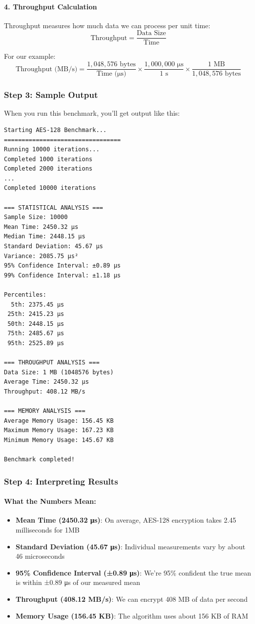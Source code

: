 \documentclass[12pt,a4paper]{article}
\begin{document}
\paragraph{4. Throughput Calculation}
Throughput measures how much data we can process per unit time:
\[ \text{Throughput} = \frac{\text{Data Size}}{\text{Time}} \]

For our example:
\[ \text{Throughput (MB/s)} = \frac{1,048,576 \text{ bytes}}{\text{Time (μs)}} \times \frac{1,000,000 \text{ μs}}{1 \text{ s}} \times \frac{1 \text{ MB}}{1,048,576 \text{ bytes}} \]

\subsubsection{Step 3: Sample Output}

When you run this benchmark, you'll get output like this:

\begin{lstlisting}[language=text, caption=Sample Benchmark Output]
Starting AES-128 Benchmark...
=================================
Running 10000 iterations...
Completed 1000 iterations
Completed 2000 iterations
...
Completed 10000 iterations

=== STATISTICAL ANALYSIS ===
Sample Size: 10000
Mean Time: 2450.32 μs
Median Time: 2448.15 μs
Standard Deviation: 45.67 μs
Variance: 2085.75 μs²
95% Confidence Interval: ±0.89 μs
99% Confidence Interval: ±1.18 μs

Percentiles:
  5th: 2375.45 μs
 25th: 2415.23 μs
 50th: 2448.15 μs
 75th: 2485.67 μs
 95th: 2525.89 μs

=== THROUGHPUT ANALYSIS ===
Data Size: 1 MB (1048576 bytes)
Average Time: 2450.32 μs
Throughput: 408.12 MB/s

=== MEMORY ANALYSIS ===
Average Memory Usage: 156.45 KB
Maximum Memory Usage: 167.23 KB
Minimum Memory Usage: 145.67 KB

Benchmark completed!
\end{lstlisting}

\subsubsection{Step 4: Interpreting Results}

\paragraph{What the Numbers Mean:}
\begin{itemize}
    \item \textbf{Mean Time (2450.32 μs)}: On average, AES-128 encryption takes 2.45 milliseconds for 1MB
    \item \textbf{Standard Deviation (45.67 μs)}: Individual measurements vary by about 46 microseconds
    \item \textbf{95\% Confidence Interval (±0.89 μs)}: We're 95\% confident the true mean is within ±0.89 μs of our measured mean
    \item \textbf{Throughput (408.12 MB/s)}: We can encrypt 408 MB of data per second
    \item \textbf{Memory Usage (156.45 KB)}: The algorithm uses about 156 KB of RAM
\end{itemize}
\end{document}
